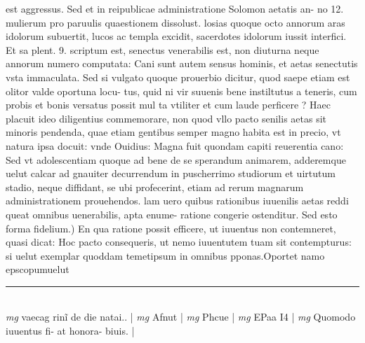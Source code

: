 \documentclass{article}
\begin{document}
\begin{pages}
est aggressus. Sed et in reipublicae administratione Solomon aetatis an- no 12. mulierum pro paruulis quaestionem dissolust. losias quoque octo annorum aras idolorum subuertit, lucos ac templa excidit, sacerdotes idolorum iussit interfici. Et sa plent. 9. scriptum est, senectus venerabilis est, non diuturna neque annorum numero computata: Cani sunt autem sensus hominis, et aetas senectutis vsta immaculata. Sed  si vulgato quoque prouerbio dicitur, quod saepe etiam est olitor valde oportuna locu-  tus, quid ni vir suuenis bene instiltutus a teneris, cum probis et bonis versatus possit mul ta vtiliter et cum laude perficere ? Haec placuit ideo diligentius commemorare, non quod vllo pacto senilis aetas sit minoris pendenda, quae etiam gentibus semper magno habita est in precio, vt natura ipsa docuit: vnde Ouidius: Magna fuit quondam capiti reuerentia cano: Sed vt adolescentiam quoque ad bene de se sperandum animarem, adderemque  uelut calcar ad gnauiter decurrendum in puscherrimo studiorum et uirtutum stadio, neque  diffidant, se ubi profecerint, etiam ad rerum magnarum administrationem prouehendos. lam uero quibus rationibus iuuenilis aetas reddi queat omnibus uenerabilis, apta enume- ratione congerie ostenditur.  \pend\pstart Sed esto forma fidelium.) En qua ratione possit efficere, ut iuuentus non contemneret, quasi dicat: Hoc pacto consequeris, ut nemo iuuentutem tuam sit contempturus: si uelut exemplar quoddam temetipsum in omnibus pponas.Oportet namo epscopumuelut  \pend
\vspace{0.5cm}\noindent
\vspace{0.2cm}\rule{1cm}{0.2pt}\\ 
\hspace{0.2cm}\textit{mg}
\footnotesize vaecag rinĩ de die natai.. 
\normalsize| 
\hspace{0.2cm}\textit{mg}
\footnotesize Afnut 
\normalsize| 
\hspace{0.2cm}\textit{mg}
\footnotesize Phcue 
\normalsize| 
\hspace{0.2cm}\textit{mg}
\footnotesize EPaa I4 
\normalsize| 
\hspace{0.2cm}\textit{mg}
\footnotesize Quomodo iuuentus fi- at honora- biuis. 
\normalsize| 

\end{pages}
\end{document}
